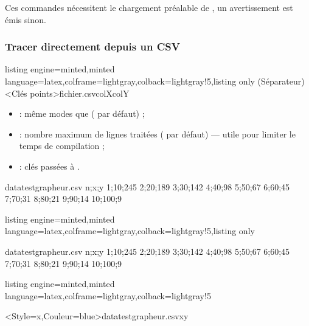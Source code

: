 \documentclass[11pt,a4paper]{ltxdoc}
\begin{document}
\begin{tcolorbox}[colframe=orange,colback=orange!5]
Ces commandes nécessitent le chargement préalable de , un avertissement est émis sinon.
\end{tcolorbox}

\subsubsection{Tracer directement depuis un CSV}

\begin{tcblisting}{listing engine=minted,minted language=latex,colframe=lightgray,colback=lightgray!5,listing only}
\TracerNuageDepuisCSV[Clés](Séparateur)<Clés points>{fichier.csv}{colX}{colY}
\end{tcblisting}

\begin{itemize}
  \item {} : même modes que  ( par défaut) ;
  \item {} : nombre maximum de lignes traitées ( par défaut) — utile pour limiter le temps de compilation ;
  \item {} : clés passées à .
\end{itemize}

\begin{filecontents*}[overwrite]{datatestgrapheur.csv}
n;x;y
1;10;245
2;20;189
3;30;142
4;40;98
5;50;67
6;60;45
7;70;31
8;80;21
9;90;14
10;100;9
\end{filecontents*}

\begin{tcblisting}{listing engine=minted,minted language=latex,colframe=lightgray,colback=lightgray!5,listing only}
\begin{filecontents*}{datatestgrapheur.csv}
n;x;y
1;10;245
2;20;189
3;30;142
4;40;98
5;50;67
6;60;45
7;70;31
8;80;21
9;90;14
10;100;9
\end{filecontents*}
\end{tcblisting}

\begin{tcblisting}{listing engine=minted,minted language=latex,colframe=lightgray,colback=lightgray!5}
\begin{GraphiqueTikz}%
    [x=0.08cm,y=0.02cm,Xmin=0,Xmax=110,%
    Ymin=0,Ymax=250,Xgrille=10,Xgrilles=10,Ygrille=50,Ygrilles=50]
  \TracerNuageDepuisCSV<Style=x,Couleur=blue>{datatestgrapheur.csv}{x}{y}
\end{GraphiqueTikz}
\end{tcblisting}
\end{document}
